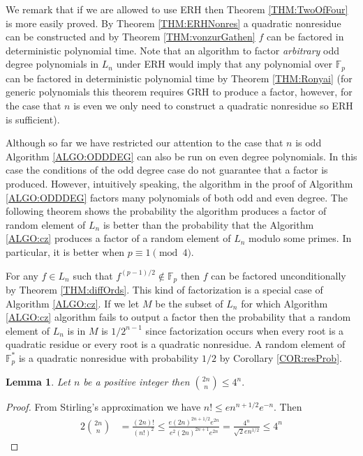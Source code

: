 \documentclass{article}
\newcounter{dummy} \numberwithin{dummy}{section}
\theoremstyle{plain}
\newtheorem{lem}[dummy]{Lemma}
\theoremstyle{definition}
\def\Fp {{ \mathbb{F} _ {p} }}
\def\FP {{ \mathbb{F}^* _ {p} }}
\begin{document}
		We remark that if we are allowed to use ERH then Theorem \ref{THM:TwoOfFour} is more easily proved. By Theorem \ref{THM:ERHNonres} a quadratic nonresidue can be constructed and by Theorem \ref{THM:vonzurGathen} $f$ can be factored in deterministic polynomial time. Note that an algorithm to factor \emph{arbitrary} odd degree polynomials in $L_n$ under ERH would imply that any polynomial over $\Fp$ can be factored in deterministic polynomial time by Theorem \ref{THM:Ronyai} (for generic polynomials this theorem requires GRH to produce a factor, however, for the case that $n$ is even we only need to construct a quadratic nonresidue so ERH is sufficient).
							
		Although so far we have restricted our attention to the case that $n$ is odd Algorithm \ref{ALGO:ODDDEG} can also be run on even degree polynomials. In this case the conditions of the odd degree case do not guarantee that a factor is produced. However, intuitively speaking, the algorithm in the proof of Algorithm \ref{ALGO:ODDDEG} factors many polynomials of both odd and even degree. The following theorem shows the probability the algorithm produces a factor of random element of $L_n$ is better than the probability that the Algorithm \ref{ALGO:cz} produces a factor of a random element of $L_n$ modulo some primes. In particular, it is better when $p \equiv 1 \pmod 4$. 
		
		For any $f \in L_n$ such that $f^{(p-1)/2} \not\in \Fp$ then $f$ can be factored unconditionally by Theorem \ref{THM:diffOrds}. This kind of factorization is a special case of Algorithm \ref{ALGO:cz}. If we let $M$ be the subset of $L_n$ for which Algorithm \ref{ALGO:cz} algorithm fails to output a factor then the probability that a random element of $L_n$ is in $M$ is $1/2^{n-1}$ since factorization occurs when every root is a quadratic residue or every root is a quadratic nonresidue. A random element of $\FP$ is a quadratic nonresidue with probability $1/2$ by Corollary \ref{COR:resProb}.
		
		\begin{lem}
		\label{LEM:binB}
		    Let $n$ be a positive integer then $\binom{2n}{n} \leq 4^n.$
		\end{lem}
		
		\begin{proof}
		    From Stirling's approximation we have $n! \leq en^{n+1/2}e^{-n}$. Then
				\begin{alignat*}{2}
				\binom{2n}{n} &= \frac{(2n)!}{(n!)^2} \leq \frac{e(2n)^{2n+1/2}e^{2n}}{e^2(2n)^{2n+1}e^{2n}} = \frac{4^n}{\sqrt{2}en^{1/2}} \leq 4^n 
				\end{alignat*}				
		\end{proof}
			
\end{document}
